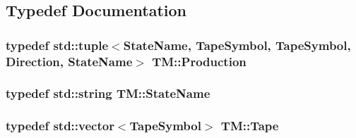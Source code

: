 \subsection{\-Typedef \-Documentation}
\hypertarget{namespaceTM_a87460339f40338ea4e37433443965554}{
\subsubsection[{\-Production}]{\setlength{\rightskip}{0pt plus 5cm}typedef std\-::tuple$<${\bf \-State\-Name}, {\bf \-Tape\-Symbol}, {\bf \-Tape\-Symbol}, {\bf \-Direction}, {\bf \-State\-Name}$>$ {\bf \-T\-M\-::\-Production}}}\label{d6/d65/namespaceTM_a87460339f40338ea4e37433443965554}
\hypertarget{namespaceTM_a852554502c474841ede5736b807839ff}{
\subsubsection[{\-State\-Name}]{\setlength{\rightskip}{0pt plus 5cm}typedef std\-::string {\bf \-T\-M\-::\-State\-Name}}}\label{d6/d65/namespaceTM_a852554502c474841ede5736b807839ff}
\hypertarget{namespaceTM_a20b31cfe7d86b00db299e72ad48f70af}{
\subsubsection[{\-Tape}]{\setlength{\rightskip}{0pt plus 5cm}typedef std\-::vector$<${\bf \-Tape\-Symbol}$>$ {\bf \-T\-M\-::\-Tape}}}\label{d6/d65/namespaceTM_a20b31cfe7d86b00db299e72ad48f70af}


